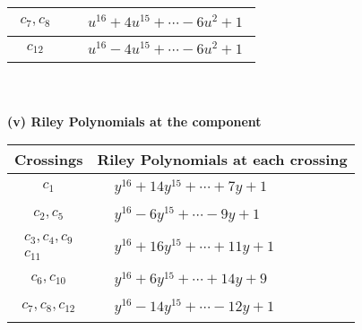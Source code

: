 \documentclass[1p]{elsarticle_modified}
\theoremstyle{definition}
\begin{document}
\begin{tabular}{m{50pt}|m{274pt}}
\hline $$\begin{aligned}c_{7},c_{8}\end{aligned}$$&$\begin{aligned}
&u^{16}+4 u^{15}+\cdots-6 u^2+1
\end{aligned}$\\
\hline $$\begin{aligned}c_{12}\end{aligned}$$&$\begin{aligned}
&u^{16}-4 u^{15}+\cdots-6 u^2+1
\end{aligned}$\\
\hline
\end{tabular}\\~\\
\newpage\renewcommand{\arraystretch}{1}
\flushleft \textbf{(v) Riley Polynomials at the component}\newline \\
\begin{tabular}{m{50pt}|m{274pt}}
Crossings & \hspace{64pt}Riley Polynomials at each crossing \\
\hline $$\begin{aligned}c_{1}\end{aligned}$$&$\begin{aligned}
&y^{16}+14 y^{15}+\cdots+7 y+1
\end{aligned}$\\
\hline $$\begin{aligned}c_{2},c_{5}\end{aligned}$$&$\begin{aligned}
&y^{16}-6 y^{15}+\cdots-9 y+1
\end{aligned}$\\
\hline $$\begin{aligned}c_{3},c_{4},c_{9}\\c_{11}\end{aligned}$$&$\begin{aligned}
&y^{16}+16 y^{15}+\cdots+11 y+1
\end{aligned}$\\
\hline $$\begin{aligned}c_{6},c_{10}\end{aligned}$$&$\begin{aligned}
&y^{16}+6 y^{15}+\cdots+14 y+9
\end{aligned}$\\
\hline $$\begin{aligned}c_{7},c_{8},c_{12}\end{aligned}$$&$\begin{aligned}
&y^{16}-14 y^{15}+\cdots-12 y+1
\end{aligned}$\\
\hline
\end{tabular}\\~\\
\end{document}

